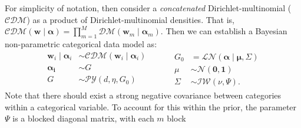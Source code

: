     For simplicity of notation, then consider a \emph{concatenated} 
    Dirichlet-multinomial ($\mathcal{CDM}$) as a product of 
    Dirichlet-multinomial densities.  That is, 
    $\mathcal{CDM}(\bm{w}\mid\bm{\alpha}) = 
        \prod_{m = 1}^M\mathcal{DM}(\bm{w}_m\mid\bm{\alpha}_m)$.
    Then we can establish a Bayesian non-parametric categorical data model as:
    \begin{equation}
      \label{eqn:modelcat}
      \begin{aligned}
      \bm{w}_i \mid \bm{\alpha}_i &\sim 
        \mathcal{CDM}\left(\bm{w}_i\mid\bm{\alpha}_i\right)\\
      \bm{\alpha_i} &\sim G\\
      G &\sim \mathcal{PY}\left(d, \eta, G_0\right)\\
      \end{aligned}
      ~\hspace{1cm}
      \begin{aligned}
      G_0 &= \mathcal{LN}\left(\bm{\alpha}\mid\bm{\mu},\Sigma\right)\\
      \mu &\sim \mathcal{N}\left(\bm{0},\bm{1}\right)\\
      \Sigma &\sim \mathcal{IW}\left(\nu, \Psi\right).
      \end{aligned}
    \end{equation}
    Note that there should exist a strong negative covariance between categories 
    within a categorical variable.  To account for this within the prior, the 
    parameter $\Psi$ is a blocked diagonal matrix, with each $m$ block 
